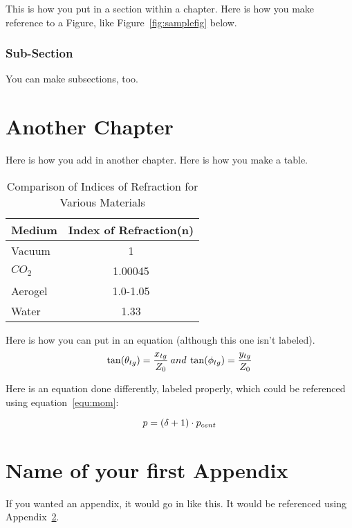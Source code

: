 \documentclass[12pt, oneside]{smuthesis}
\begin{document}
This is how you put in a section within a chapter.
Here is how you make reference to a Figure, like Figure~\ref{fig:samplefig}
 below.


\subsection{\sc Sub-Section}

You can make subsections, too.

\newpage

\chapter{Another Chapter}

Here is how you add in another chapter.
Here is how you make a table. \\

\begin{table}
\caption{Comparison of Indices of Refraction for Various Materials}
\label{tab:refindex}
\centering
\begin{tabular}{l|c}
\hline \hline
Medium    & Index of Refraction(n) \\
\hline
Vacuum    & 1                     \\
$CO_{2}$  & 1.00045               \\
Aerogel   & 1.0-1.05              \\
Water     & 1.33                  \\
\hline \hline
\end{tabular}
\end{table}

Here is how you can put in an equation (although this one isn't labeled). \\

\begin{displaymath}
\centering
\tan(\theta_{tg}) = \frac{x_{tg}}{Z_{0}} \: and \:
\tan(\phi_{tg}) = \frac{y_{tg}}{Z_{0}}
\end{displaymath}

Here is an equation done differently, labeled properly, which could be 
referenced using equation~\ref{equ:mom}:

\begin{equation}
\centering
p = (\delta + 1)\cdot p_{cent}
\label{equ:mom}
\end{equation}


\appendix

\chapter{Name of your first Appendix}
\label{app:optics}

If you wanted an appendix, it would go in like this.  It would be 
referenced using Appendix~\ref{app:optics}.


\begin{singlespace}

\end{singlespace}
\end{document}
